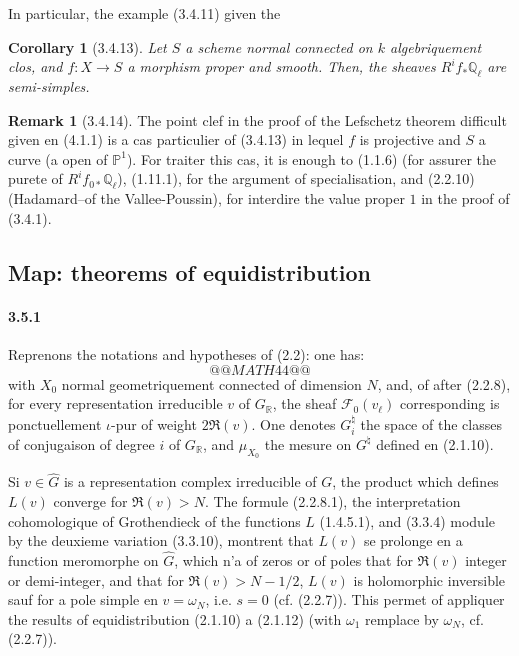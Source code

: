 \documentclass[12pt,a4paper]{article}
\theoremstyle{plain}
\newtheorem{corollary}[theorem]{Corollary}
\theoremstyle{definition}
\newtheorem{remark}[theorem]{Remark}
\theoremstyle{remark}
\newcommand{\QQ}{{\mathbb{Q}}}
\newcommand{\RR}{{\mathbb{R}}}
\newcommand{\PP}{{\mathbb{P}}}
\begin{document}
In particular, the example (3.4.11) given the

\begin{corollary}[3.4.13]
Let $S$ a scheme normal connected on $k$ algebriquement clos, and $f : X \to S$ a morphism proper and smooth. Then, the sheaves $R^i f_* \QQ_\ell$ are semi-simples.
\end{corollary}

\begin{remark}[3.4.14]
The point clef in the proof of the Lefschetz theorem difficult given en (4.1.1) is a cas particulier of (3.4.13) in lequel $f$ is projective and $S$ a curve (a open of $\PP^1$). For traiter this cas, it is enough to (1.1.6) (for assurer the purete of $R^i f_{0*} \QQ_\ell$), (1.11.1), for the argument of specialisation, and (2.2.10) (Hadamard--of the Vallee-Poussin), for interdire the value proper $1$ in the proof of (3.4.1).
\end{remark}

\subsection{Map: theorems of equidistribution}

\paragraph{3.5.1}
Reprenons the notations and hypotheses of (2.2): one has:
\[
@@MATH44@@
\]
with $X_0$ normal geometriquement connected of dimension $N$, and, of after (2.2.8), for every representation irreducible $v$ of $G_\RR$, the sheaf $\mathscr{F}_0(v_\ell)$ corresponding is ponctuellement $\iota$-pur of weight $2\Re(v)$. One denotes $G_i^\natural$ the space of the classes of conjugaison of degree $i$ of $G_\RR$, and $\mu_{X_0}$ the mesure on $G^\natural$ defined en (2.1.10).

Si $v \in \widehat{G}$ is a representation complex irreducible of $G$, the product which defines $L(v)$ converge for $\Re(v) > N$. The formule (2.2.8.1), the interpretation cohomologique of Grothendieck of the functions $L$ (1.4.5.1), and (3.3.4) module by the deuxieme variation (3.3.10), montrent that $L(v)$ se prolonge en a function meromorphe on $\widehat{G}$, which n'a of zeros or of poles that for $\Re(v)$ integer or demi-integer, and that for $\Re(v) > N - 1/2$, $L(v)$ is holomorphic inversible sauf for a pole simple en $v = \omega_{N}$, i.e. $s = 0$ (cf. (2.2.7)). This permet of appliquer the results of equidistribution (2.1.10) a (2.1.12) (with $\omega_1$ remplace by $\omega_N$, cf. (2.2.7)).
\end{document}
